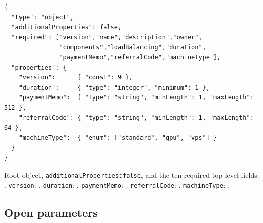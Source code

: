 \begin{lstlisting}[caption={Root object of the \specv{9} RFC-0 draft schema (reconstructed). Look at \texttt{additional\allowbreak{}Properties:\allowbreak{}false} together with the five new required fields: this combination is what makes an unrecognised key --- including v8's removed \texttt{enterprise} --- a hard validation failure rather than a silent drop, and what makes \texttt{paymentMemo}\slash\texttt{referralCode}\slash\texttt{machineType} required inputs to a document that \S\ref{sec:finding} shows no \FluxOS code yet reads.}, label={lst:v9-schema}]
{
  "type": "object",
  "additionalProperties": false,
  "required": ["version","name","description","owner",
               "components","loadBalancing","duration",
               "paymentMemo","referralCode","machineType"],
  "properties": {
    "version":      { "const": 9 },
    "duration":     { "type": "integer", "minimum": 1 },
    "paymentMemo":  { "type": "string", "minLength": 1, "maxLength": 512 },
    "referralCode": { "type": "string", "minLength": 1, "maxLength": 64 },
    "machineType":  { "enum": ["standard", "gpu", "vps"] }
  }
}
\end{lstlisting}

Root object, \texttt{additional\allowbreak{}Properties:\allowbreak{}false}, and the ten required top-level fields:
. \texttt{version}: .
\texttt{duration}: . \texttt{paymentMemo}:
. \texttt{referralCode}: .
\texttt{machineType}: .

\subsection{Open parameters}

